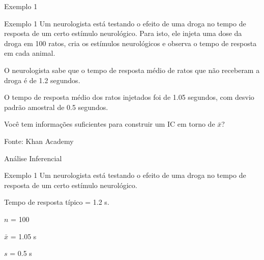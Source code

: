 \documentclass{beamer}
\begin{document}
\begin{frame}{Exemplo 1}
  \begin{exampleblock}{Exemplo 1}
    \footnotesize
    Um neurologista está testando o efeito de uma droga no tempo de
    resposta de um certo estímulo neurológico.
    Para isto, ele injeta uma dose da droga em \alert{100} ratos, cria
    os estímulos neurológicos e observa o tempo de resposta em cada
    animal.

    \smallskip
    O neurologista sabe que o tempo de resposta médio de ratos que não
    receberam a droga é de \alert{1.2 segundos}.

    \smallskip
    O tempo de resposta médio dos ratos injetados foi de
    \alert{1.05 segundos}, com desvio padrão amostral de
    \alert{0.5 segundos}.
  \end{exampleblock}
  \begin{block}{}
    Você tem informações suficientes para construir um IC em torno de $\bar{x}$?
  \end{block}
  \hfill {\scriptsize Fonte: Khan Academy}
\end{frame}

\begin{frame}{Análise Inferencial}
  \begin{exampleblock}{Exemplo 1}
    \scriptsize
    Um neurologista está testando o efeito de uma droga no tempo de
    resposta de um certo estímulo neurológico.

    \smallskip
    Tempo de resposta típico = \alert<2->{1.2 s}.

    \smallskip
    $n$ = \alert{100}

    $\bar{x}$ = \alert{1.05 s}

    $s$ = \alert{0.5 s}

  \end{exampleblock}
\end{frame}
\end{document}
